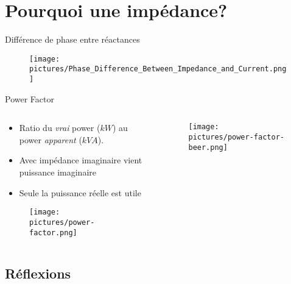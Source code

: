 \section{Pourquoi une impédance?}

\begin{frame}{Différence de phase entre réactances}
    \begin{figure}
        \centering
        \texttt{[image: pictures/Phase\_Difference\_Between\_Impedance\_and\_Current.png]}
    \end{figure}
\end{frame}

\begin{frame}{Power Factor}
    \begin{columns}
        \begin{column}{0.5\textwidth}
            \begin{itemize}
                \item Ratio du \textit{vrai} power ($kW$) au power \textit{apparent} ($kVA$).
                \item Avec impédance imaginaire vient puissance imaginaire
                \item Seule la puissance réelle est utile
            \end{itemize}
            \begin{figure}
                \centering
                \texttt{[image: pictures/power-factor.png]}
            \end{figure}
        \end{column}
        \begin{column}{0.5\textwidth}
            \begin{figure}
                \centering
                \texttt{[image: pictures/power-factor-beer.png]}
            \end{figure}
        \end{column}
    \end{columns}
\end{frame}


\subsection{Réflexions}

